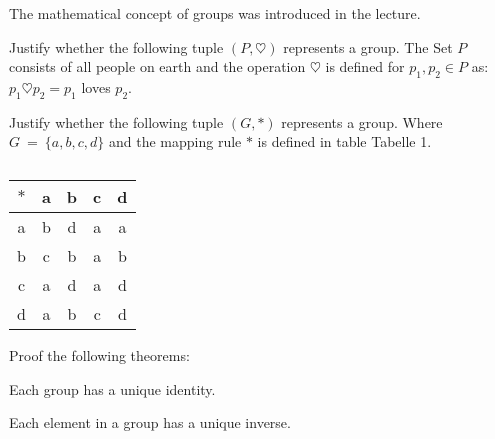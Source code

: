 \begin{aufgabe}[Groups (1/2)]
The mathematical concept of groups was introduced in the lecture. 

\begin{teilaufgabe}
\item Justify whether the following tuple $(P,\heartsuit)$ represents a group. The Set $P$ consists of all people on earth and the operation 	$\heartsuit$ is defined for $p_1, p_2 \in P $ 
as: $p_1 	\heartsuit p_2 = p_1$ loves $p_2$.

\end{teilaufgabe}

\begin{teilaufgabe}
\item Justify whether the following tuple $(G,*)$ represents a group. Where $G~=~\{a,b,c,d\}$ and the mapping rule $*$ is defined in table Tabelle 1.

    \begin{table}[h!]
                \centering
                \begin{tabular}{c|c|c|c|c}
                    $*$  & a & b & c & d \\ \hline
                    a    & b & d & a & a \\
                    b    & c & b & a & b\\
                    c    & a & d & a & d\\
                    d    & a & b & c & d
                \end{tabular}
                \caption{}
                \label{tab:t1}
            \end{table}
\end{teilaufgabe}

\end{aufgabe}



\begin{aufgabe}[Groups (2/2)]
Proof the following theorems:

\begin{teilaufgabe}
\item Each group has a unique identity.
\end{teilaufgabe}

\begin{teilaufgabe}
\item Each element in a group has a unique inverse.
\end{teilaufgabe}

\end{aufgabe}



